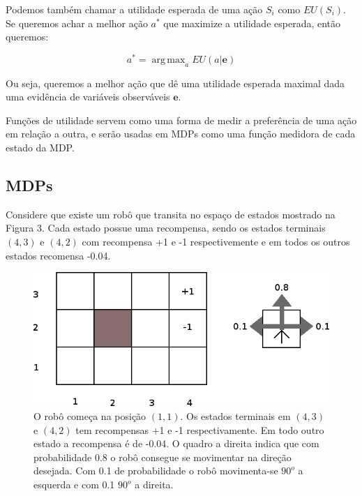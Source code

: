 \documentclass[a4paper,10pt]{article}
\DeclareMathOperator*{\argmax}{arg\,max}
\theoremstyle{plain}
\begin{document}
Podemos também chamar a utilidade esperada de uma ação $S_i$ como $EU(S_i)$. Se queremos achar a
melhor ação $a^*$ que maximize a utilidade esperada, então queremos:

\begin{equation*}
  a^* = \argmax_a EU(a|\mathbf{e})
\end{equation*}

Ou seja, queremos a melhor ação que dê uma utilidade esperada maximal dada uma evidência de
variáveis observáveis $\mathbf{e}$.

Funções de utilidade servem como uma forma de medir a preferência de uma ação em relação a outra,
e serão usadas em MDPs como uma função medidora de cada estado da MDP.

\newpage

\subsection{MDPs}

Considere que existe um robô que transita no espaço de estados mostrado na Figura 3. Cada estado
possue uma recompensa, sendo os estados terminais $(4, 3)$ e $(4, 2)$ com recompensa +1 e -1
respectivemente e em todos os outros estados recomensa -0.04.

\begin{figure}[h]
  \begin{center}
    \includegraphics[scale=0.4]{imgs/grid4x3.png}
  \end{center}
  \caption{O robô começa na posição $(1, 1)$. Os estados terminais em $(4, 3)$ e $(4, 2)$ tem
  recompensas +1 e -1 respectivamente. Em todo outro estado a recompensa é de -0.04. O quadro a
  direita indica que com probabilidade 0.8 o robô consegue se movimentar na direção desejada. Com
  0.1 de probabilidade o robô movimenta-se $90^o$ a esquerda e com 0.1 $90^o$ a direita.}
\end{figure}
\end{document}
